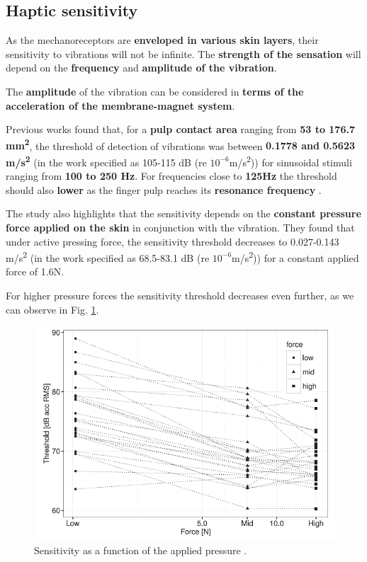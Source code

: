 \subsection{Haptic sensitivity}
\label{Haptic sensitivity}

As the mechanoreceptors are \textbf{enveloped in various skin layers}, their sensitivity to vibrations will not be infinite. The \textbf{strength of the sensation} will depend on the \textbf{frequency} and \textbf{amplitude of the vibration}. 

The \textbf{amplitude} of the vibration can be considered in \textbf{terms of the acceleration of the membrane-magnet system}.

Previous works \cite{Vibrotactile_Sensitivity} found that, for a \textbf{pulp contact area} ranging from \textbf{53 to 176.7 mm\textsuperscript{2}}, the threshold of detection of vibrations was between \textbf{0.1778 and 0.5623 m/s\textsuperscript{2}} (in the work specified as 105-115 dB (re $10^{-6}$m/s\textsuperscript{2})) for sinusoidal stimuli ranging from \textbf{100 to 250 Hz}. 
For frequencies close to \textbf{125Hz} the threshold should also \textbf{lower} as the finger pulp reaches its \textbf{resonance frequency} \cite{Skin_freqs_penetration}.

The study also highlights that the sensitivity depends on the \textbf{constant pressure force applied on the skin} in conjunction with the vibration.
They found that under active pressing force, the sensitivity threshold decreases to 0.027-0.143 m/s\textsuperscript{2} (in the work specified as 68.5-83.1 dB (re $10^{-6}$m/s\textsuperscript{2})) for a constant applied force of 1.6N.

\begin{samepage}
    For higher pressure forces the sensitivity threshold decreases even further, as we can observe in Fig. \ref{fig: Vibrotactile_Sensitivity}.
    \begin{figure}[H]
        \centering
        \includegraphics[width=0.5\linewidth]{Chapters/Chapter3/Haptics_Physics/Figures/vibr_thr_vs_pressure_force.png}
        \caption[Sensitivity as a function of the applied pressure.]{Sensitivity as a function of the applied pressure \cite{Skin_freqs_penetration}.}
        \label{fig: Vibrotactile_Sensitivity}
    \end{figure}
\end{samepage}

